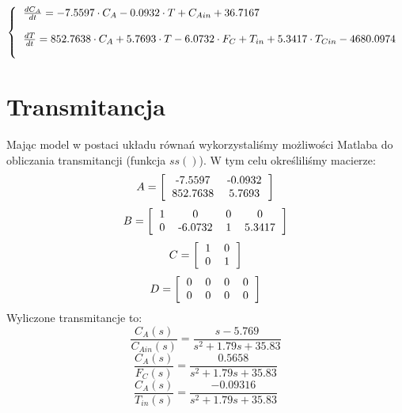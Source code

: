 \begin{equation}
\left\{
\begin{tabular}{l}
$\frac{dC_A}{dt} = -7.5597\cdot C_A-0.0932\cdot T+C_{Ain} + 36.7167$\\\\
$\frac{dT}{dt} = 852.7638\cdot C_A + 5.7693\cdot T -6.0732\cdot F_C + T_{in} + 5.3417\cdot T_{Cin} - 4680.0974$\\\\
\end{tabular}
\right.
\end{equation}
\newpage
\section{Transmitancja}
Mając model w postaci układu równań wykorzystaliśmy możliwości Matlaba do obliczania transmitancji (funkcja $ss()$). W tym celu określiliśmy macierze:
\begin{equation}
	A=\left[
	\begin{tabular}{c c}
	-7.5597&-0.0932\\852.7638&5.7693
	\end{tabular}
	\right]
\end{equation}
\begin{equation}
B=\left[
\begin{tabular}{c c c c}
1&0&0&0\\0&-6.0732&1&5.3417
\end{tabular}
\right]
\end{equation}
\begin{equation}
C=\left[
\begin{tabular}{c c}
1&0\\0&1
\end{tabular}
\right]
\end{equation}
\begin{equation}
D=\left[
\begin{tabular}{c c c c}
0&0&0&0\\0&0&0&0
\end{tabular}
\right]
\end{equation}
Wyliczone transmitancje to:
\begin{equation}
	\frac{C_A(s)}{C_{Ain}(s)} = \frac{s-5.769}{s^2+1.79s+35.83}
\end{equation}
\begin{equation}
\frac{C_A(s)}{F_C(s)} = \frac{0.5658}{s^2+1.79s+35.83}
\end{equation}
\begin{equation}
\frac{C_A(s)}{T_{in}(s)} = \frac{-0.09316}{s^2+1.79s+35.83}
\end{equation}

